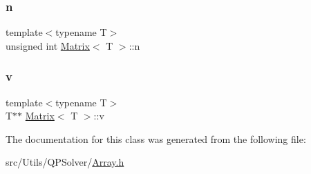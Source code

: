 \mbox{\label{classMatrix_afe2ef09343ff36b98618d696e7b232e3_afe2ef09343ff36b98618d696e7b232e3}} 
\subsubsection{\texorpdfstring{n}{n}}
{\footnotesize\ttfamily template$<$typename T$>$ \\
unsigned int \mbox{\hyperlink{classMatrix}{Matrix}}$<$ T $>$\+::n\hspace{0.3cm}{\ttfamily [private]}}

\mbox{\label{classMatrix_a0914658ee459304d3dbcc26806038019_a0914658ee459304d3dbcc26806038019}} 
\subsubsection{\texorpdfstring{v}{v}}
{\footnotesize\ttfamily template$<$typename T$>$ \\
T$\ast$$\ast$ \mbox{\hyperlink{classMatrix}{Matrix}}$<$ T $>$\+::v\hspace{0.3cm}{\ttfamily [private]}}



The documentation for this class was generated from the following file\+:\begin{DoxyCompactItemize}
\item 
src/\+Utils/\+Q\+P\+Solver/\mbox{\hyperlink{Array_8h}{Array.\+h}}\end{DoxyCompactItemize}

